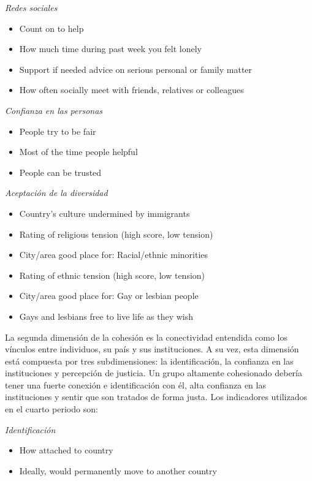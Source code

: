 \documentclass[
  12pt,
]{book}
\begin{document}
\emph{Redes sociales}

\begin{itemize}
\item
  Count on to help
\item
  How much time during past week you felt lonely
\item
  Support if needed advice on serious personal or family matter
\item
  How often socially meet with friends, relatives or colleagues
\end{itemize}

\emph{Confianza en las personas}

\begin{itemize}
\item
  People try to be fair
\item
  Most of the time people helpful
\item
  People can be trusted
\end{itemize}

\emph{Aceptación de la diversidad}

\begin{itemize}
\item
  Country's culture undermined by immigrants
\item
  Rating of religious tension (high score, low tension)
\item
  City/area good place for: Racial/ethnic minorities
\item
  Rating of ethnic tension (high score, low tension)
\item
  City/area good place for: Gay or lesbian people
\item
  Gays and lesbians free to live life as they wish
\end{itemize}

La segunda dimensión de la cohesión es la conectividad entendida como
los vínculos entre individuos, su país y sus instituciones. A su vez,
esta dimensión está compuesta por tres subdimensiones: la
identificación, la confianza en las instituciones y percepción de
justicia. Un grupo altamente cohesionado debería tener una fuerte
conexión e identificación con él, alta confianza en las instituciones y
sentir que son tratados de forma justa. Los indicadores utilizados en el
cuarto periodo son:

\emph{Identificación}

\begin{itemize}
\item
  How attached to country
\item
  Ideally, would permanently move to another country
\end{itemize}
\end{document}
